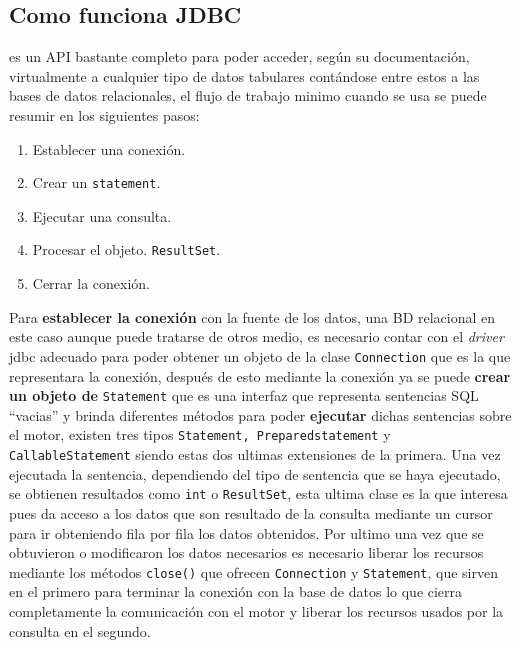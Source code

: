 \subsection{Como funciona JDBC}
\jd es un API bastante completo para poder acceder, según su documentación, virtualmente a cualquier tipo de datos tabulares contándose entre estos a las bases de datos relacionales, el flujo de trabajo minimo cuando se usa \jd se puede resumir en los siguientes pasos:
%
\begin{enumerate}
\item Establecer una conexión. %
\item Crear un \verb=statement=. %
\item Ejecutar una consulta. %
\item Procesar el objeto. \verb=ResultSet=. %
\item Cerrar la conexión. %
\end{enumerate}

Para \textbf{establecer la conexión} con la  fuente de los datos, una BD relacional en este caso aunque puede tratarse de otros medio, es necesario contar con el \textit{driver} jdbc adecuado para poder obtener un objeto de la clase \verb=Connection= que es la que representara la conexión, después de esto mediante la conexión ya se puede \textbf{crear un objeto de} \verb=Statement= que es una interfaz que representa sentencias SQL ``vacias'' y brinda diferentes métodos para poder \textbf{ejecutar} dichas sentencias sobre el motor, existen tres tipos \verb=Statement, Preparedstatement= y \verb=CallableStatement= siendo estas dos ultimas extensiones de la primera. Una vez ejecutada la sentencia, dependiendo del tipo de sentencia que se haya ejecutado, se obtienen resultados como \verb=int= o \verb=ResultSet=, esta ultima clase es la que interesa pues da acceso a los datos que son resultado de la consulta mediante un cursor para ir obteniendo fila por fila los datos obtenidos. Por ultimo una vez que se obtuvieron o modificaron los datos necesarios es necesario liberar los recursos mediante los métodos \verb=close()= que ofrecen \verb=Connection= y \verb=Statement=,  que sirven en el primero para terminar la conexión con la base de datos lo que cierra completamente la comunicación con el motor y liberar los recursos usados por la consulta en el segundo\citep{java:jdbc:tutorial}.

